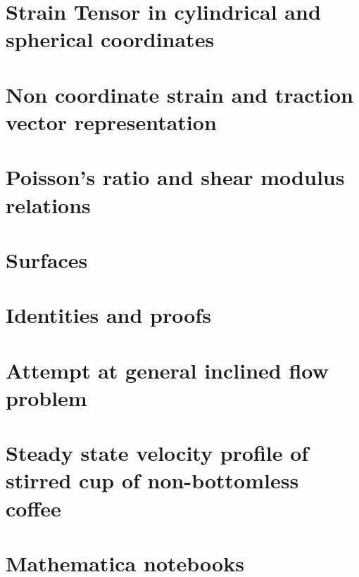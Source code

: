 \chapter{Strain Tensor in cylindrical and spherical coordinates}
   

\chapter{Non coordinate strain and traction vector representation}
   

\chapter{Poisson's ratio and shear modulus relations}
   

\chapter{Surfaces}

\chapter{Identities and proofs}
   
   
   

\chapter{Attempt at general inclined flow problem}
   

\chapter{Steady state velocity profile of stirred cup of non-bottomless coffee}
   

\chapter{Mathematica notebooks}
   
